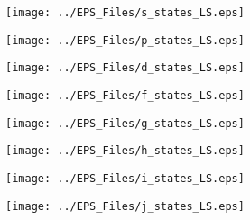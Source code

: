 \documentclass[12pt,a4paper,titlepage]{jarticle}
\begin{document}
\begin{figure}[H]
\begin{center}
\texttt{[image: ../EPS\_Files/s\_states\_LS.eps]}
\end{center}
\end{figure}

\begin{figure}[H]
\begin{center}
\texttt{[image: ../EPS\_Files/p\_states\_LS.eps]}
\end{center}
\end{figure}

\begin{figure}[H]
\begin{center}
\texttt{[image: ../EPS\_Files/d\_states\_LS.eps]}
\end{center}
\end{figure}

\begin{figure}[H]
\begin{center}
\texttt{[image: ../EPS\_Files/f\_states\_LS.eps]}
\end{center}
\end{figure}

\begin{figure}[H]
\begin{center}
\texttt{[image: ../EPS\_Files/g\_states\_LS.eps]}
\end{center}
\end{figure}

\begin{figure}[H]
\begin{center}
\texttt{[image: ../EPS\_Files/h\_states\_LS.eps]}
\end{center}
\end{figure}

\begin{figure}[H]
\begin{center}
\texttt{[image: ../EPS\_Files/i\_states\_LS.eps]}
\end{center}
\end{figure}

\begin{figure}[H]
\begin{center}
\texttt{[image: ../EPS\_Files/j\_states\_LS.eps]}
\end{center}
\end{figure}
\end{document}
